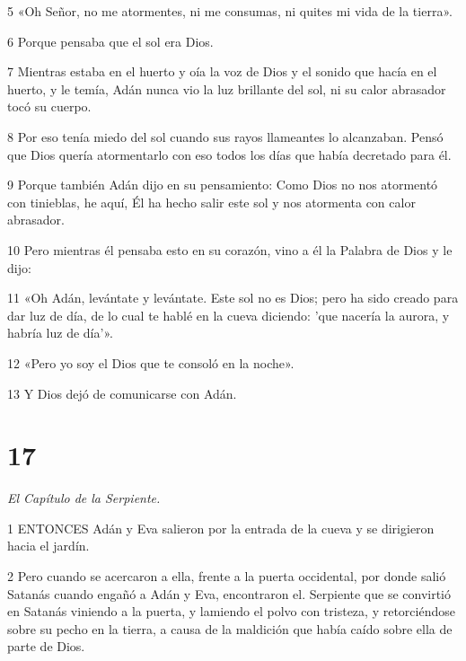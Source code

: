 \par 5 «Oh Señor, no me atormentes, ni me consumas, ni quites mi vida de la tierra».

\par 6 Porque pensaba que el sol era Dios.

\par 7 Mientras estaba en el huerto y oía la voz de Dios y el sonido que hacía en el huerto, y le temía, Adán nunca vio la luz brillante del sol, ni su calor abrasador tocó su cuerpo.

\par 8 Por eso tenía miedo del sol cuando sus rayos llameantes lo alcanzaban. Pensó que Dios quería atormentarlo con eso todos los días que había decretado para él.

\par 9 Porque también Adán dijo en su pensamiento: Como Dios no nos atormentó con tinieblas, he aquí, Él ha hecho salir este sol y nos atormenta con calor abrasador.

\par 10 Pero mientras él pensaba esto en su corazón, vino a él la Palabra de Dios y le dijo:

\par 11 «Oh Adán, levántate y levántate. Este sol no es Dios; pero ha sido creado para dar luz de día, de lo cual te hablé en la cueva diciendo: 'que nacería la aurora, y habría luz de día'».

\par 12 «Pero yo soy el Dios que te consoló en la noche».

\par 13 Y Dios dejó de comunicarse con Adán.



\chapter{17}

\par \textit{El Capítulo de la Serpiente.}

\par 1 ENTONCES Adán y Eva salieron por la entrada de la cueva y se dirigieron hacia el jardín.

\par 2 Pero cuando se acercaron a ella, frente a la puerta occidental, por donde salió Satanás cuando engañó a Adán y Eva, encontraron el. Serpiente que se convirtió en Satanás viniendo a la puerta, y lamiendo el polvo con tristeza, y retorciéndose sobre su pecho en la tierra, a causa de la maldición que había caído sobre ella de parte de Dios.

